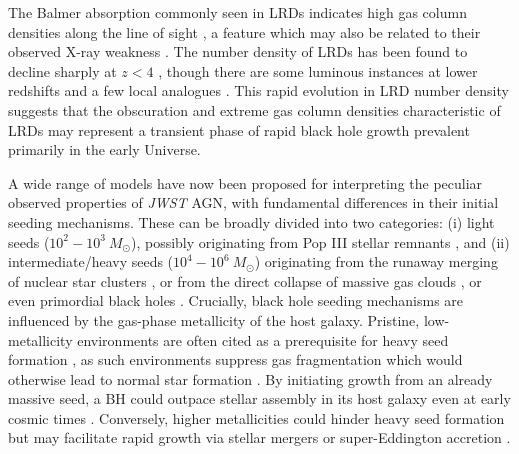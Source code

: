\documentclass[fleqn,usenatbib]{mnras}
\newcommand{\jwst}{\textit{JWST}\xspace}
\begin{document}
The Balmer absorption commonly seen in LRDs indicates high gas column densities along the line of sight \citep[][]{Juodzbalis2024_Rosetta, InayoshiMaiolino2025, Chang2026}, a feature which may also be related to their observed X-ray weakness \citep{Maiolino2025_Chandra}. 
The number density of LRDs has been found to decline sharply at $z<4$ \citep{Kocevski2025, Inayoshi2025_LRD}, though there are some luminous instances at lower redshifts \citep[e.g. $z\sim2-3$;][]{Juodzbalis2024_Rosetta, Loiacono2025, Wang2025, EuclidCollaboration2025, Ma2025_CountingLRD, Rinaldi2025} and a few local analogues \citep[e.g. $z\sim0.1$;][]{Lin2026, Ji2026}. This rapid evolution in LRD number density suggests that the obscuration and extreme gas column densities characteristic of LRDs may represent a transient phase of rapid black hole growth prevalent primarily in the early Universe.

A wide range of models have now been proposed for interpreting the peculiar observed properties of \jwst AGN, with fundamental differences in their initial seeding mechanisms. These can be broadly divided into two categories: (i) light seeds ($10^2-10^3 \ M_\odot$), possibly originating from Pop III stellar remnants \citep[e.g.][]{Nandal2025, Cammelli2025, Sanati2025, Prole2025}, and (ii) intermediate/heavy seeds ($10^4-10^6 \ M_\odot$) originating from the runaway merging of nuclear star clusters  \citep[e.g.][possibly resulting from the `feedback-free starbursts' proposed by \citealt{Dekel2025_LRD, Dekel2025}]{Partmann2025, Rantala2025}, or from the direct collapse of massive gas clouds \citep[e.g.][]{Natarajan2024, Jeon_DCBH2025, Pacucci2026}, or even primordial black holes \citep[e.g.][]{Zhang_PBH2025,DayalMaiolino2026}. Crucially, black hole seeding mechanisms are influenced by the gas-phase metallicity of the host galaxy. Pristine, low-metallicity environments are often cited as a prerequisite for heavy seed formation \citep[e.g.][]{Begelman2006, Ferrara2014, Latif2016, Maiolino2025_QSO1}, as such environments suppress gas fragmentation which would otherwise lead to normal star formation \citep{Inayoshi_rev2020}. By initiating growth from an already massive seed, a BH could outpace stellar assembly in its host galaxy even at early cosmic times \citep[$z\gtrsim4$; e.g.][]{Natarajan2024, Pacucci2023}. %
Conversely, higher metallicities could hinder heavy seed formation \citep{Latif2016} but may facilitate rapid growth via stellar mergers or super-Eddington accretion \citep{Inayoshi_rev2020}.
\end{document}
